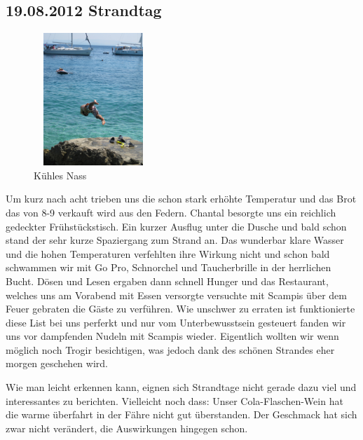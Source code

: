 \subsection{19.08.2012 Strandtag}

\begin{figure} 
  \begin{centering}
    \includegraphics[width=0.4\textwidth, height=5cm, keepaspectratio]{../Bilder/Sommer2012/78.jpg}
    \caption{Kühles Nass}
  \end{centering}
\end{figure} 

Um kurz nach acht trieben uns die schon stark erhöhte Temperatur und das Brot das von 8-9 verkauft wird aus den Federn.
Chantal besorgte uns ein reichlich gedeckter Frühstückstisch.
Ein kurzer Ausflug unter die Dusche und bald schon stand der sehr kurze Spaziergang zum Strand an.
Das wunderbar klare Wasser und die hohen Temperaturen verfehlten ihre Wirkung nicht und schon bald schwammen wir mit Go Pro, Schnorchel und Taucherbrille in der herrlichen Bucht.
Dösen und Lesen ergaben dann schnell Hunger und das Restaurant, welches uns am Vorabend mit Essen versorgte versuchte mit Scampis über dem Feuer gebraten die Gäste zu verführen.
Wie unschwer zu erraten ist funktionierte diese List bei uns perferkt und nur vom Unterbewusstsein gesteuert fanden wir uns vor dampfenden Nudeln mit Scampis wieder.
Eigentlich wollten wir wenn möglich noch Trogir besichtigen, was jedoch dank des schönen Strandes eher morgen geschehen wird.

Wie man leicht erkennen kann, eignen sich Strandtage nicht gerade dazu viel und interessantes zu berichten.
Vielleicht noch dass: Unser Cola-Flaschen-Wein hat die warme überfahrt in der Fähre nicht gut überstanden.
Der Geschmack hat sich zwar nicht verändert, die Auswirkungen hingegen schon.

